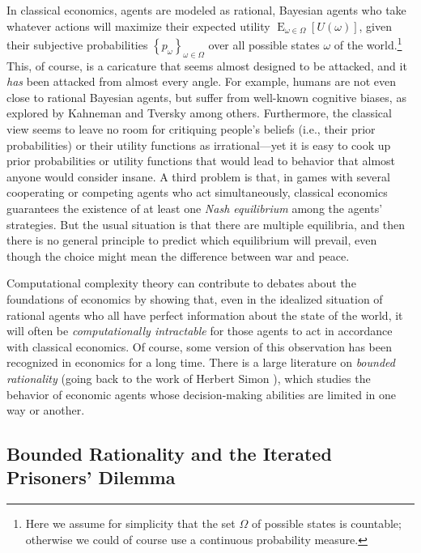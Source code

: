 \documentclass[12pt,onecolumn]{article}%
\begin{document}
In classical economics, agents are modeled as rational, Bayesian agents who
take whatever actions will maximize their expected utility $\operatorname*{E}%
_{\omega\in\Omega}\left[  U\left(  \omega\right)  \right]  $, given their
subjective probabilities $\left\{  p_{\omega}\right\}  _{\omega\in\Omega}%
$ over all possible states $\omega$ of the world.\footnote{Here we assume
for simplicity that the set $\Omega$ of possible states is countable;
otherwise we could of course use a continuous probability measure.} This, of
course, is a caricature that seems almost designed to be attacked, and it
\textit{has} been attacked from almost every angle. For example, humans are
not even close to rational Bayesian agents, but suffer from well-known
cognitive biases, as explored by Kahneman and Tversky \cite{kahnemantversky}%
 among others. Furthermore, the classical view seems to leave no room for
critiquing people's beliefs (i.e., their prior probabilities) or their utility
functions as irrational---yet it is easy to cook up prior probabilities or
utility functions that would lead to behavior that almost anyone would
consider insane. A third problem is that, in games with several cooperating
or competing agents who act simultaneously, classical economics guarantees the
existence of at least one \textit{Nash equilibrium} among the agents'
strategies. But the usual situation is that there are multiple equilibria,
and then there is no general principle to predict which equilibrium will
prevail, even though the choice might mean the difference between war and peace.

Computational complexity theory can contribute to debates about the
foundations of economics by showing that, even in the idealized situation of
rational agents who all have perfect information about the state of the world,
it will often be \textit{computationally intractable} for those agents to act
in accordance with classical economics. Of course, some version of this
observation has been recognized in economics for a long time. There is a
large literature on \textit{bounded rationality} (going back to the work of
Herbert Simon \cite{herbsimon}), which studies the behavior of economic agents
whose decision-making abilities are limited in one way or another.

\subsection{Bounded Rationality and the Iterated Prisoners' Dilemma\label{IPD}%
}
\end{document}
